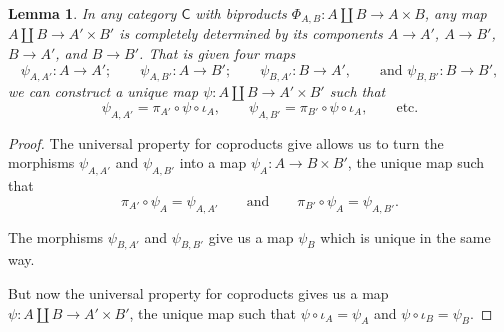 \documentclass[a4paper]{report}
\theoremstyle{definition}
\theoremstyle{plain}
\newtheorem{lemma}{Lemma}[section]
\theoremstyle{remark}
\begin{document}
\begin{lemma}
  \label{lemma:mapcoprodtoproddeterminedbycomponents}
  In any category $\mathsf{C}$ with biproducts $\Phi_{A, B}\colon A \amalg B \to A \times B$, any map $A \amalg B \to A' \times B'$ is completely determined by its components $A \to A'$, $A \to B'$, $B \to A'$, and $B \to B'$. That is given four maps
  \begin{equation*}
    \psi_{A, A'}\colon A \to A';\qquad \psi_{A, B'}\colon A \to B';\qquad \psi_{B,A'}\colon B \to A',\qquad\text{and } \psi_{B,B'}\colon B \to B',
  \end{equation*}
  we can construct a unique map $\psi\colon A \amalg B \to A' \times B'$ such that
  \begin{equation*}
    \psi_{A, A'} = \pi_{A'} \circ \psi \circ \iota_{A},\qquad \psi_{A,B'} = \pi_{B'} \circ \psi \circ \iota_{A},\qquad\text{etc.}
  \end{equation*}
\end{lemma}
\begin{proof}
  The universal property for coproducts give allows us to turn the morphisms $\psi_{A,A'}$ and $\psi_{A, B'}$ into a map $\psi_{A}\colon A \to B \times B'$, the unique map such that 
  \begin{equation*}
    \pi_{A'} \circ \psi_{A} = \psi_{A,A'} \qquad\text{and}\qquad\pi_{B'} \circ \psi_{A} = \psi_{A,B'}.
  \end{equation*}

  The morphisms $\psi_{B,A'}$ and $\psi_{B,B'}$ give us a map $\psi_{B}$ which is unique in the same way.

  But now the universal property for coproducts gives us a map $\psi\colon A \amalg B \to A' \times B'$, the unique map such that $\psi \circ \iota_{A} = \psi_{A}$ and $\psi \circ \iota_{B} = \psi_{B}$.
\end{proof}
\end{document}
